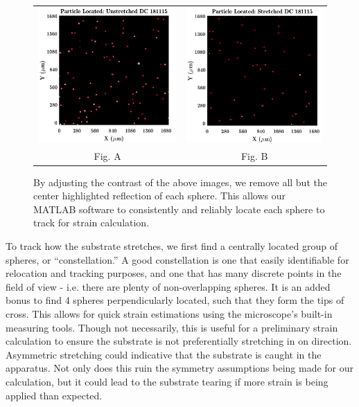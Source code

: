 \begin{figure}[h!]
	\begin{tabular}{cc}
		\includegraphics[width= .5\linewidth]{Chapters/Figures/particle_located_unstretched.pdf} & \includegraphics[width= .5\linewidth]{Chapters/Figures/particle_located_stretched.pdf}\\
		Fig. A & Fig. B
	\end{tabular}
	\caption[Particle-Locating for Stretch Calibration]{By adjusting the contrast of the above images, we remove all but the center highlighted reflection of each sphere. This allows our MATLAB software to consistently and reliably locate each sphere to track for strain calculation.}
	\label{fig:particleTracking}
\end{figure}


To track how the substrate stretches, we first find a centrally located group of spheres, or ``constellation.'' A good constellation is one that easily identifiable for relocation and tracking purposes, and one that has many discrete points in the field of view - i.e. there are plenty of non-overlapping spheres. It is an added bonus to find 4 spheres perpendicularly located, such that they form the tips of cross. This allows for quick strain estimations using the microscope's built-in measuring tools. Though not necessarily, this is useful for a preliminary strain calculation to ensure the substrate is not preferentially stretching in on direction. Asymmetric stretching could indicative that the substrate is caught in the apparatus. Not only does this ruin the symmetry assumptions being made for our calculation, but it could lead to the substrate tearing if more strain is being applied than expected. 

